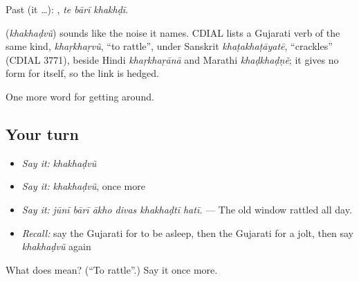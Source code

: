 Past (it …):   , \emph{te bārī khakhḍī}.

\begin{cousinweb}
\textbf{} (\emph{khakhaḍvũ}) sounds like the noise it names. CDIAL lists a Gujarati verb of the same kind, \emph{khaṛkhaṛvũ}, \textquotedblleft{}to rattle\textquotedblright{}, under Sanskrit \emph{khaṭakhaṭāyatē}, \textquotedblleft{}crackles\textquotedblright{} (CDIAL 3771), beside Hindi \emph{khaṛkhaṛānā} and Marathi \emph{khaḍkhaḍṇẽ}; it gives no form for  itself, so the link is hedged.
\end{cousinweb}

\begin{grammarlens}[title={What you've built}]
One more word for getting around.
\end{grammarlens}

\subsection*{Your turn}
\begin{itemize}
\raggedright
  \item \emph{Say it:} \emph{khakhaḍvũ}
  \item \emph{Say it:} \emph{khakhaḍvũ}, once more
  \item \emph{Say it:} \emph{jūnī bārī ākho divas khakhaḍtī hatī.} — The old window rattled all day.
  \item \emph{Recall:} say the Gujarati for to be asleep, then the Gujarati for a jolt, then say \emph{khakhaḍvũ} again
\end{itemize}

\begin{tcolorbox}[breakable,colback=teal!4,colframe=teal!35!black,title={Before you move on}]
What does  mean? (\textquotedblleft{}To rattle\textquotedblright{}.) Say it once more.
\end{tcolorbox}
